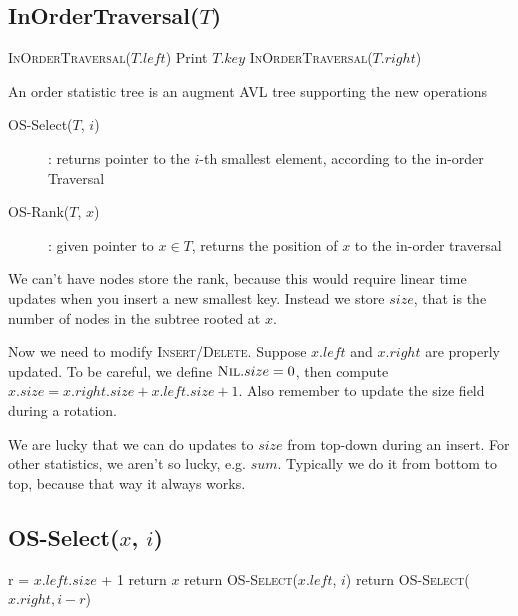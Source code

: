 \subsection*{InOrderTraversal($T$)}
\begin{algorithmic}[1]
    \State \textsc{InOrderTraversal}($T.left$)
    \State Print $T.key$
    \State \textsc{InOrderTraversal}($T.right$)
\end{algorithmic}

An order statistic tree is an augment AVL tree supporting the new operations
\begin{description}
    \item[OS-Select($T$, $i$)]: returns pointer to the $i$-th smallest element, according to the in-order Traversal
    \item[OS-Rank($T$, $x$)]: given pointer to $x \in T$, returns the position of $x$ to the in-order traversal
\end{description}
We can't have nodes store the rank, because this would require linear time updates when you insert a new smallest key. Instead we store $size$, that is the number of nodes in the subtree rooted at $x$. 

Now we need to modify \textsc{Insert}/\textsc{Delete}. Suppose $x.left$ and $x.right$ are properly updated. To be careful, we define $\textsc{Nil}.size = 0$, then compute $x.size = x.right.size + x.left.size + 1$. Also remember to update the size field during a rotation.

We are lucky that we can do updates to $size$  from top-down during an insert. For other statistics, we aren't so lucky, e.g. $sum$. Typically we do it from bottom to top, because that way it always works.

\subsection*{OS-Select($x$, $i$)}
\begin{algorithmic}[1]
    \State r = $x.left.size$ + 1 
    \State return $x$
    \State return \textsc{OS-Select}($x.left$, $i$)
    \State return \textsc{OS-Select}($x.right, i - r$)
    \EndIf
\end{algorithmic}


